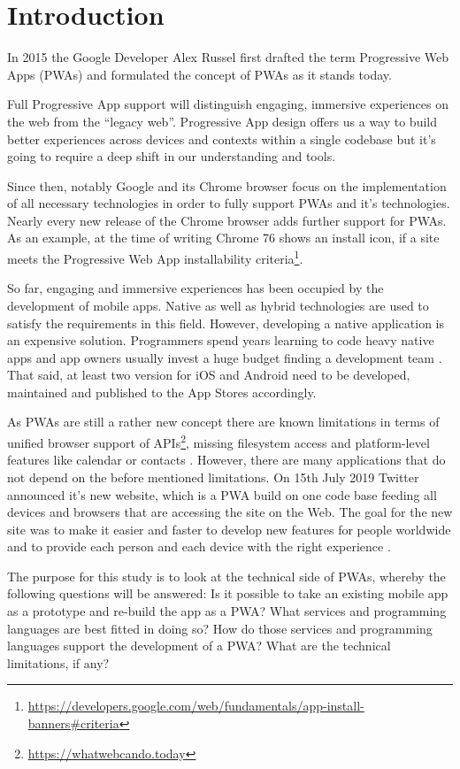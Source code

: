 \chapter{Introduction}

In 2015 the Google Developer Alex Russel first drafted the term Progressive Web Apps (PWAs) and formulated the concept of PWAs as it stands today.

Full Progressive App support will distinguish engaging, immersive experiences on the web from the “legacy web”. Progressive App design offers us a way to build better experiences across devices and contexts within a single codebase but it’s going to require a deep shift in our understanding and tools. \citep{russellProgressiveWebApps2015}

Since then, notably Google and its Chrome browser focus on the implementation of all necessary technologies in order to fully support PWAs and it's technologies. Nearly every new release of the Chrome browser adds further support for PWAs. As an example, at the time of writing Chrome 76 shows an install icon, if a site meets the Progressive Web App installability criteria\footnote{\url{https://developers.google.com/web/fundamentals/app-install-banners\#criteria}}.

So far, engaging and immersive experiences has been occupied by the development of mobile apps. Native as well as hybrid technologies are used to satisfy the requirements in this field. However, developing a native application is an expensive solution. Programmers spend years learning to code heavy native apps and app owners usually invest a huge budget finding a development team \citep{nguyen2019progressive}. That said, at least two version for iOS and Android need to be developed, maintained and published to the App Stores accordingly.

As PWAs are still a rather new concept there are known limitations in terms of unified browser support of APIs\footnote{\url{https://whatwebcando.today}}, missing filesystem access and platform-level features like calendar or contacts \citep{biorn-hansenProgressiveWebApps2018,malavoltaNativeAppsWeb2016}. However, there are many applications that do not depend on the before mentioned limitations. On 15th July 2019 Twitter announced it's new website, which is a PWA build on one code base feeding all devices and browsers that are accessing the site on the Web. The goal for the new site was to make it easier and faster to develop new features for people worldwide and to provide each person and each device with the right experience \citep{croomBuildingNewTwitter2019}.

The purpose for this study is to look at the technical side of PWAs, whereby the following questions will be answered:
Is it possible to take an existing mobile app as a prototype and re-build the app as a PWA?
What services and programming languages are best fitted in doing so?
How do those services and programming languages support the development of a PWA?
What are the technical limitations, if any?
